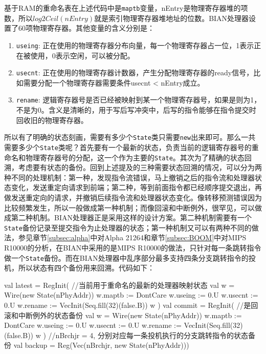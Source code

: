 基于RAM的重命名表在上述代码中是\texttt{maptb}变量，nEntry是物理寄存器堆的项数，所以$ log2Ceil(nEntry) $就是索引物理寄存器堆地址的位数。BIAN处理器设置了60项物理寄存器。其他变量的含义分别是：
\begin{enumerate}[label=(\alph*)]
	\item \texttt{useing}: 正在使用的物理寄存器分布向量，每一个物理寄存器占一位，1表示正在被使用，0表示空闲，可以被分配。
	\item \texttt{usecnt}: 正在使用的物理寄存器计数器，产生分配物理寄存器的ready信号，比如需要分配一个物理寄存器需要条件usecnt < nEntry成立。
	\item \texttt{rename}: 逻辑寄存器号是否已经被映射到某一个物理寄存器号，如果是则为1，不是为0。含义是清晰的，用于写后写冲突中，后写的指令能够在指令提交时回收旧的物理寄存器。
\end{enumerate}

所以有了明确的状态刻画，需要有多少个\texttt{State}类只需要\texttt{new}出来即可。那么一共需要多少个\texttt{State}类呢？首先要有一个最新的状态，负责当前的逻辑寄存器号的重命名和物理寄存器号的分配，这一个作为主要的\texttt{State}。其次为了精确的状态回溯，考虑要有状态的备份。回到上述提及的三种需要状态回溯的情况，可以分为两种不同的处理机制：第一种，发现指令流错误，马上撤销之后的指令流和处理器状态变化，发送重定向请求到前端；第二种，等到前面指令都已经顺序提交退出，再做发送重定向的请求，并撤销后续指令流和处理器状态变化。像转移预测错误因为比较频繁发生，所以一般做成第一种机制；而像回滚和中断例外，很罕见，可以做成第二种机制。BIAN处理器正是采用这样的设计方案。第二种机制需要有一个\texttt{State}备份记录至提交指令为止处理器的状态；第一种机制又可以有两种不同的做法，参见章节\ref{subsec:alpha}中对Alpha 21264和章节\ref{subsec:BOOM}中对MIPS R10000的分析，在BIAN中采用的是MIPS R10000的做法，只针对每一条跳转指令做一个\texttt{State}备份。而在BIAN处理器中乱序部分最多支持四条分支跳转指令的投机，所以状态有四个备份用来回溯。代码如下：
\begin{scala}
	val latest = RegInit({ //当前用于重命名的最新的处理器映射状态
		val w = Wire(new State(nPhyAddr))
		w.maptb  := DontCare
		w.useing := 0.U
		w.usecnt := 0.U
		w.rename := VecInit(Seq.fill(32)(false.B))
		w
	})
	val commit = RegInit({ //是回滚和中断例外的状态备份
		val w = Wire(new State(nPhyAddr))
		w.maptb  := DontCare
		w.useing := 0.U
		w.usecnt := 0.U
		w.rename := VecInit(Seq.fill(32)(false.B))
		w
	})
	//nBrchjr = 4, 分别对应每一条投机执行的分支跳转指令的状态备份
	val backup = Reg(Vec(nBrchjr, new State(nPhyAddr)))
\end{scala}	

